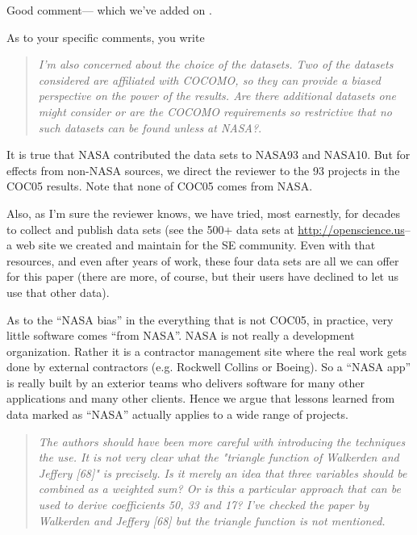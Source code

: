 \noindent
Good comment--- which we've added
on .




\noindent
As to your specific comments, you write \begin{quote}{\em I'm
  also concerned about the choice of the
  datasets. Two of the datasets considered are
  affiliated with COCOMO, so they can provide a
  biased perspective on the power of the
  results. Are there additional datasets one might
  consider or are the COCOMO requirements so
  restrictive that no such datasets can be found
  unless at NASA?}. \end{quote}
 
 \noindent It is true that NASA contributed the data sets to NASA93 and NASA10.
  But for effects from non-NASA sources, we direct the reviewer to the 93 projects
  in the COC05
  results. Note that none of COC05 comes from NASA.

  Also, as I'm sure the reviewer knows,
  we have tried, most earnestly, for decades to collect
and publish  data sets (see the 
500+ data sets at \url{http://openscience.us}-- a web site we created and maintain for the SE community.
Even with that resources, and even after years of work,
these four data sets are all we can offer for this paper
(there are more, of course, but their users have declined
to let us use that other data).
 
  As to the ``NASA bias'' in the everything that is not COC05,
  in practice, very little software comes
``from NASA''. NASA is not
really a development organization. Rather it is a contractor
management site where the real work gets done by external
contractors (e.g. Rockwell Collins or Boeing). So a ``NASA app''
is really built by an exterior teams who delivers software
for many other applications and many other clients. Hence we argue
that lessons learned from data
marked as ``NASA'' actually applies
to a wide range of projects.
 
     \begin{quote}{\em The authors should have been more careful with introducing the techniques the use. It is not very clear what the "triangle function of Walkerden and Jeffery [68]" is precisely. Is it merely an idea that three variables should be combined as a weighted sum? Or is this a particular approach that can be used to derive coefficients 50, 33 and 17? I've checked the paper by Walkerden and Jeffery [68] but the triangle function is not mentioned.}\end{quote}

